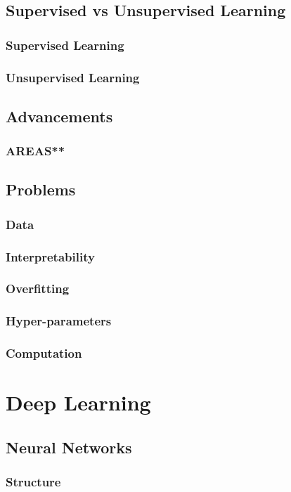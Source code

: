 \documentclass{book}
\begin{document}
\begin{appendices}
  \section{Supervised vs Unsupervised Learning}
    \subsection{Supervised Learning}
    \subsection{Unsupervised Learning}
  \section{Advancements}
    \subsection{AREAS**}
  \section{Problems}
    \subsection{Data}
    \subsection{Interpretability}
    \subsection{Overfitting}
    \subsection{Hyper-parameters}
    \subsection{Computation}

\chapter{Deep Learning}
  \section{Neural Networks}
    \subsection{Structure}

\end{appendices}
\end{document}
